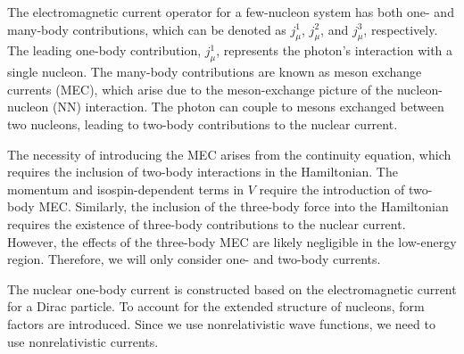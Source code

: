 The electromagnetic current operator for a few-nucleon system has both one- and many-body contributions, which
can be denoted as $j_\mu^1$, $j_\mu^2$, and $j_\mu^3$, respectively. The leading one-body contribution,
$j_\mu^1$, represents the photon's interaction with a single nucleon. The many-body contributions are known as
meson exchange currents (MEC), which arise due to the meson-exchange picture of the nucleon-nucleon (NN)
interaction. The photon can couple to mesons exchanged between two nucleons, leading to two-body contributions to
the nuclear current.

The necessity of introducing the MEC arises from the continuity equation, which requires the inclusion of
two-body interactions in the Hamiltonian. The momentum and isospin-dependent terms in $V$ require the
introduction of two-body MEC. Similarly, the inclusion of the three-body force into the Hamiltonian requires the
existence of three-body contributions to the nuclear current. However, the effects of the three-body MEC are
likely negligible in the low-energy region. Therefore, we will only consider one- and two-body currents.

The nuclear one-body current is constructed based on the electromagnetic current for a Dirac particle. To account
for the extended structure of nucleons, form factors are introduced. Since we use nonrelativistic wave functions,
we need to use nonrelativistic currents.




